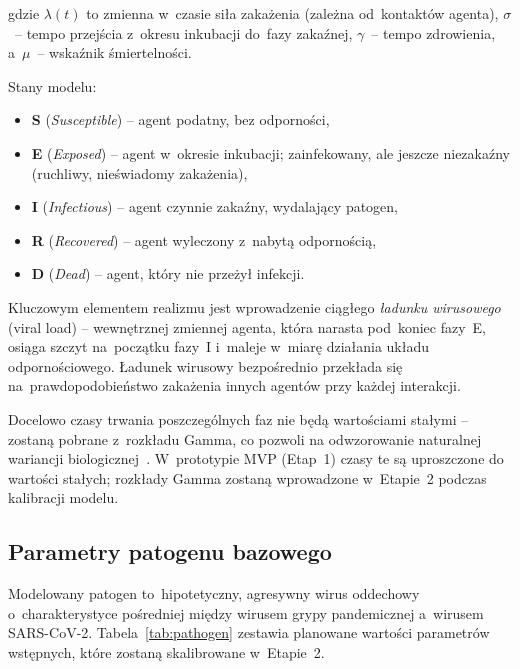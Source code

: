 \documentclass[polish]{projectreport}
\begin{document}
\noindent gdzie $\lambda(t)$ to zmienna w~czasie siła zakażenia (zależna
od~kontaktów agenta), $\sigma$~-- tempo przejścia z~okresu inkubacji do~fazy
zakaźnej, $\gamma$~-- tempo zdrowienia, a~$\mu$~-- wskaźnik śmiertelności.

Stany modelu:
\begin{itemize}
  \item \textbf{S} (\textit{Susceptible}) -- agent podatny, bez odporności,
  \item \textbf{E} (\textit{Exposed}) -- agent w~okresie inkubacji; zainfekowany,
        ale jeszcze niezakaźny (ruchliwy, nieświadomy zakażenia),
  \item \textbf{I} (\textit{Infectious}) -- agent czynnie zakaźny, wydalający
        patogen,
  \item \textbf{R} (\textit{Recovered}) -- agent wyleczony z~nabytą odpornością,
  \item \textbf{D} (\textit{Dead}) -- agent, który nie przeżył infekcji.
\end{itemize}

Kluczowym elementem realizmu jest wprowadzenie ciągłego \textit{ładunku
wirusowego} (viral load) -- wewnętrznej zmiennej agenta, która narasta
pod~koniec fazy~E, osiąga szczyt na~początku fazy~I i~maleje w~miarę działania
układu odpornościowego. Ładunek wirusowy bezpośrednio przekłada się
na~prawdopodobieństwo zakażenia innych agentów przy każdej interakcji.

Docelowo czasy trwania poszczególnych faz nie będą wartościami stałymi --
zostaną pobrane z~rozkładu Gamma, co pozwoli na odwzorowanie naturalnej
wariancji biologicznej~\cite{lloyd2001realistic}. W~prototypie MVP (Etap~1)
czasy te są uproszczone do wartości stałych; rozkłady Gamma zostaną
wprowadzone w~Etapie~2 podczas kalibracji modelu.

\subsection{Parametry patogenu bazowego}
\label{sec:pathogen-params}

Modelowany patogen to~hipotetyczny, agresywny wirus oddechowy o~charakterystyce
pośredniej między wirusem grypy pandemicznej a~wirusem SARS-CoV-2.
Tabela~\ref{tab:pathogen} zestawia planowane wartości parametrów wstępnych,
które zostaną skalibrowane w~Etapie~2.
\end{document}
